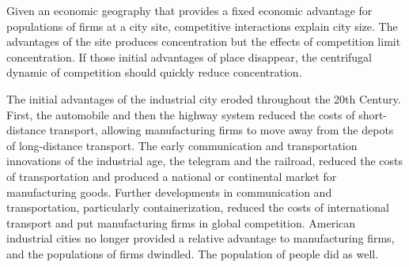 Given an economic geography that provides a fixed economic advantage
for populations of firms at a city site, competitive interactions explain
city size. The advantages of the site produces concentration but the
effects of competition limit concentration. If those initial
advantages of place disappear, the centrifugal dynamic of competition
should quickly reduce concentration.

The initial advantages of the industrial city eroded throughout the
20th Century. First, the automobile and then the highway system
reduced the costs of short-distance transport, allowing manufacturing
firms to move away from the depots of long-distance transport. The
early communication and transportation innovations of the industrial
age, the telegram and the railroad, reduced the costs of
transportation and produced a national or continental market for
manufacturing goods. Further developments in communication and
transportation, particularly containerization, reduced the costs of
international transport and put manufacturing firms in global
competition. American industrial cities no longer provided a relative
advantage to manufacturing firms, and the populations of firms
dwindled. The population of people did as well.






